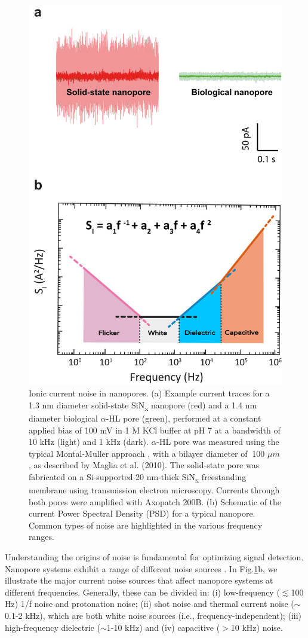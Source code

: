 \begin{figure}[!htb]
	\centering
	\includegraphics[width=0.6\linewidth]{figures/Figure3.2}
	 \caption{Ionic current noise in nanopores. (a) Example current traces for a 1.3 nm diameter solid-state SiN\textsubscript{x} nanopore (red) and a 1.4 nm diameter biological $\alpha$-HL pore (green), performed at a constant applied bias of 100 mV in 1 M KCl buffer at pH 7 at a bandwidth of 10 kHz (light) and 1 kHz (dark). $\alpha$-HL pore was measured using the typical Montal-Muller approach \cite{Montal1972}, with a bilayer diameter of $~$100 $\mu m$, as described by Maglia et al. (2010)\cite{Maglia2010}. The solid-state pore was fabricated on a Si-supported 20 nm-thick SiN\textsubscript{x} freestanding membrane using transmission electron microscopy. Currents through both pores were amplified with Axopatch 200B. (b) Schematic of the current Power Spectral Density (PSD) for a typical nanopore. Common types of noise are highlighted in the various frequency ranges.}
	\label{fig:fig3.2}
\end{figure}

Understanding the origins of noise is fundamental for optimizing signal detection. Nanopore systems exhibit a range of different noise sources \cite{Sakmann2009,Tabard-Cossa2013}. In Fig.\ref{fig:fig3.2}b, we illustrate the major current noise sources that affect nanopore systems at different frequencies. Generally, these can be divided in: (i) low-frequency ($\apprle$100 Hz) 1/f noise and protonation noise; (ii) shot noise and thermal current noise ($\sim$0.1-2 kHz), which are both white noise sources (i.e., frequency-independent); (iii) high-frequency dielectric ($\sim$1-10 kHz) and (iv) capacitive ($>$10 kHz) noise.  


